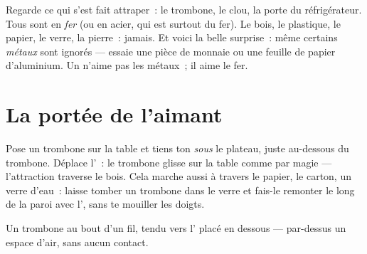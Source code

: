 \begin{example}\label{ex:g1:magnets:iron}
Regarde ce qui s'est fait attraper~: le trombone, le clou, la porte
du réfrigérateur. Tous sont en \emph{fer} (ou en acier, qui est
surtout du fer). Le bois, le plastique, le papier, le verre, la
pierre~: jamais. Et voici la belle surprise~: même certains
\emph{métaux} sont ignorés --- essaie une pièce de monnaie ou une
feuille de papier d'aluminium. Un  n'aime pas les métaux~; il
aime le fer.
\end{example}

\section{La portée de l'aimant}

\begin{example}\label{ex:g1:magnets:through}
Pose un trombone sur la table et tiens ton  \emph{sous} le
plateau, juste au-dessous du trombone. Déplace l'~: le trombone
glisse sur la table comme par magie --- l'attraction traverse le
bois. Cela marche aussi à travers le papier, le carton, un verre
d'eau~: laisse tomber un trombone dans le verre et fais-le remonter
le long de la paroi avec l', sans te mouiller les doigts.
\end{example}

\begin{omfigure}

{\small Un trombone au bout d'un fil, tendu vers l' placé en
dessous --- par-dessus un espace d'air, sans aucun contact.}
\end{omfigure}

